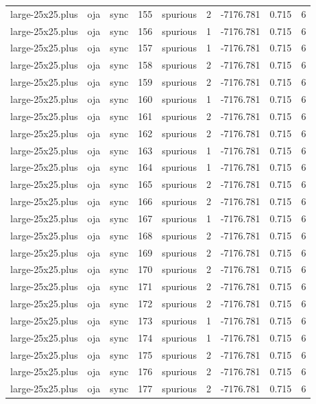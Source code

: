 \begin{tabular}{lllrlrrrr}
large-25x25.plus & oja & sync & 155 & spurious & 2 & -7176.781 & 0.715 & 6 \\
large-25x25.plus & oja & sync & 156 & spurious & 1 & -7176.781 & 0.715 & 6 \\
large-25x25.plus & oja & sync & 157 & spurious & 1 & -7176.781 & 0.715 & 6 \\
large-25x25.plus & oja & sync & 158 & spurious & 2 & -7176.781 & 0.715 & 6 \\
large-25x25.plus & oja & sync & 159 & spurious & 2 & -7176.781 & 0.715 & 6 \\
large-25x25.plus & oja & sync & 160 & spurious & 1 & -7176.781 & 0.715 & 6 \\
large-25x25.plus & oja & sync & 161 & spurious & 2 & -7176.781 & 0.715 & 6 \\
large-25x25.plus & oja & sync & 162 & spurious & 2 & -7176.781 & 0.715 & 6 \\
large-25x25.plus & oja & sync & 163 & spurious & 1 & -7176.781 & 0.715 & 6 \\
large-25x25.plus & oja & sync & 164 & spurious & 1 & -7176.781 & 0.715 & 6 \\
large-25x25.plus & oja & sync & 165 & spurious & 2 & -7176.781 & 0.715 & 6 \\
large-25x25.plus & oja & sync & 166 & spurious & 2 & -7176.781 & 0.715 & 6 \\
large-25x25.plus & oja & sync & 167 & spurious & 1 & -7176.781 & 0.715 & 6 \\
large-25x25.plus & oja & sync & 168 & spurious & 2 & -7176.781 & 0.715 & 6 \\
large-25x25.plus & oja & sync & 169 & spurious & 2 & -7176.781 & 0.715 & 6 \\
large-25x25.plus & oja & sync & 170 & spurious & 2 & -7176.781 & 0.715 & 6 \\
large-25x25.plus & oja & sync & 171 & spurious & 2 & -7176.781 & 0.715 & 6 \\
large-25x25.plus & oja & sync & 172 & spurious & 2 & -7176.781 & 0.715 & 6 \\
large-25x25.plus & oja & sync & 173 & spurious & 1 & -7176.781 & 0.715 & 6 \\
large-25x25.plus & oja & sync & 174 & spurious & 1 & -7176.781 & 0.715 & 6 \\
large-25x25.plus & oja & sync & 175 & spurious & 2 & -7176.781 & 0.715 & 6 \\
large-25x25.plus & oja & sync & 176 & spurious & 2 & -7176.781 & 0.715 & 6 \\
large-25x25.plus & oja & sync & 177 & spurious & 2 & -7176.781 & 0.715 & 6 \\

\end{tabular}
